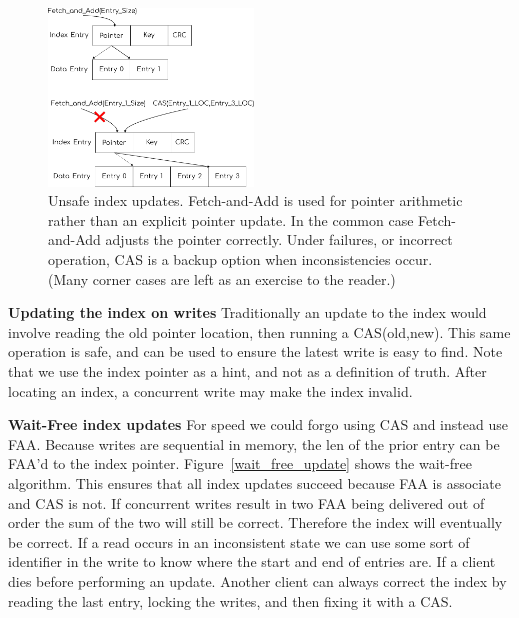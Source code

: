 \begin{figure}[t] \includegraphics[width=0.485\textwidth]{fig/write_updates.pdf}

\caption{ Unsafe index updates. Fetch-and-Add is used for pointer arithmetic
rather than an explicit pointer update. In the common case Fetch-and-Add adjusts
the pointer correctly. Under failures, or incorrect operation, CAS is a backup
option when inconsistencies occur. (Many corner cases are left as an exercise to
the reader.)}

\label{fig:wait_free_update}
\end{figure}

\textbf{Updating the index on writes} Traditionally an update to the index would
involve reading the old pointer location, then running a CAS(old,new). This same
operation is safe, and can be used to ensure the latest write is easy to find.
Note that we use the index pointer as a hint, and not as a definition of truth.
After locating an index, a concurrent write may make the index invalid.

\textbf{Wait-Free index updates} For speed we could forgo using CAS and instead use
FAA. Because writes are sequential in memory, the len of the prior entry can be
FAA'd to the index pointer. Figure~\ref{wait_free_update} shows the wait-free
algorithm. This ensures that all index updates succeed because FAA is associate
and CAS is not. If concurrent writes result in two FAA being delivered out of
order the sum of the two will still be correct. Therefore the index will
eventually be correct. If a read occurs in an inconsistent state we can use some
sort of identifier in the write to know where the start and end of entries are.
If a client dies before performing an update. Another client can always correct
the index by reading the last entry, locking the writes, and then fixing it with
a CAS.